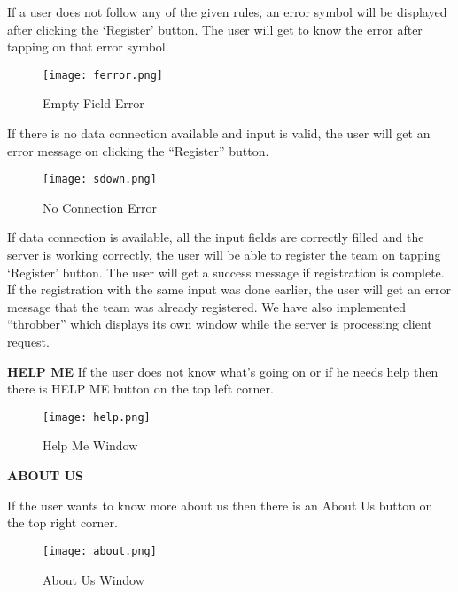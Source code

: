 \documentclass{article}
\begin{document}
\pagebreak
If a user does not follow any of the given rules, an error symbol will be displayed after clicking the ‘Register’ button. The user will get to know the error after tapping on that error symbol.
\begin{figure}[H]
	
	\hspace*{3cm}\texttt{[image: ferror.png]}
	\caption{Empty Field Error}
\end{figure}
\pagebreak
If there is no data connection available and input is valid, the user will get an error message on clicking the “Register” button.
\begin{figure}[H]
	
	\hspace*{3cm}\texttt{[image: sdown.png]}
	\caption{No Connection Error}
\end{figure}
\pagebreak
If data connection is available, all the input fields are correctly filled and the server is working correctly, the user will be able to register the team on tapping ‘Register’ button. The user will get a success message if registration is complete. If the registration with the same input was done earlier, the user will get an error message that the team was already registered. We have also implemented “throbber” which displays its own window while the server is processing client request.



\par
{}%
\hfill
{}%
\par

\pagebreak

\textbf{HELP ME}
If the user does not know what’s going on or if he needs help then there is HELP ME button on the top left corner.
\begin{figure}[H]
	\hspace*{3cm}\texttt{[image: help.png]}
	\caption{Help Me Window}
	
\end{figure}
\pagebreak
\textbf{ABOUT US}

If the user wants to know more about us then there is an About Us button on the top right corner.
\begin{figure}[H]
	\hspace*{3cm}		\texttt{[image: about.png]}
	\caption{About Us Window}
	
\end{figure}

 




	
\end{document}
